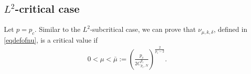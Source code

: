 \documentclass[10pt,a4paper]{article}
\newtheorem{definition}[theorem]{Definition}
\newtheorem{lemma}[theorem]{Lemma}
\theoremstyle{definition} \theoremstyle{remark}
\numberwithin{equation}{section}
\newcommand{\B}{\mathcal{B}}
\newcommand{\p}{\mathcal{P}}
\begin{document}
\subsection{$L^2$-critical case}

Let $p = p_c$. Similar to the $L^2$-subcritical case, we can prove that $\nu_{\mu,k,\delta}$, defined in \eqref{eqdefofnu}, is a critical value if
\begin{align} \label{eqbarmu}
	0 < \mu < \bar\mu := \left( \frac{p_c}{2C_{p_c,N}^{p_c}}\right) ^{\frac{2}{p_c-2}}.
\end{align}




\end{document}
